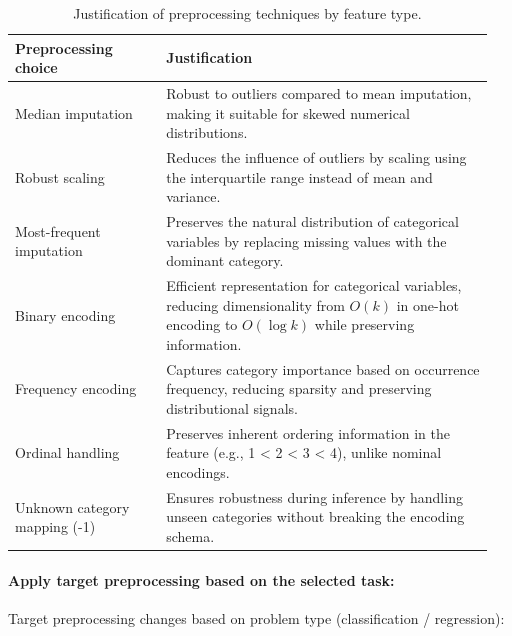 \begin{table}[!htbp]
\centering
\caption{Justification of preprocessing techniques by feature type.}
\begin{tabular}{p{0.30\linewidth}p{0.65\linewidth}}
\toprule
\textbf{Preprocessing choice} & \textbf{Justification} \\
\midrule

Median imputation &
Robust to outliers compared to mean imputation, making it suitable for skewed numerical distributions. \\

Robust scaling &
Reduces the influence of outliers by scaling using the interquartile range instead of mean and variance. \\

Most-frequent imputation &
Preserves the natural distribution of categorical variables by replacing missing values with the dominant category. \\

Binary encoding &
Efficient representation for categorical variables, reducing dimensionality from $O(k)$ in one-hot encoding to $O(\log k)$ while preserving information. \\

Frequency encoding &
Captures category importance based on occurrence frequency, reducing sparsity and preserving distributional signals. \\

Ordinal handling &
Preserves inherent ordering information in the feature (e.g., 1 < 2 < 3 < 4), unlike nominal encodings. \\

Unknown category mapping (-1) &
Ensures robustness during inference by handling unseen categories without breaking the encoding schema. \\

\bottomrule
\end{tabular}
\end{table}
\paragraph{Apply target preprocessing based on the selected task:}\par
Target preprocessing changes based on problem type (classification / regression):

